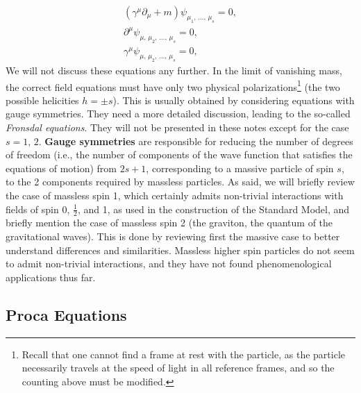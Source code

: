 \begin{equation}
    \begin{aligned}
        (\gamma^{\mu}\partial_\mu + m) \psi_{\mu_1,\,\dots,\,\mu_s} = 0, \\
        \partial^{\mu}\psi_{\mu,\,\mu_2,\,\dots,\,\mu_s} = 0,            \\
        \gamma^{\mu}\psi_{\mu,\,\mu_2,\,\dots,\,\mu_s} = 0,
    \end{aligned}
    \label{eq:fierz_pauli_equations_half_integer}
\end{equation}
We will not discuss these equations any further. In the limit of vanishing mass, the correct field equations must have only two physical polarizations\footnote{Recall that one cannot find a frame at rest with the particle, as the particle necessarily travels at the speed of light in all reference frames, and so the counting above must be modified.} (the two possible helicities \(h=\pm s\)). This is usually obtained by considering equations with gauge symmetries. They need a more detailed discussion, leading to the so-called \textit{Fronsdal equations}. They will not be presented in these notes except for the case \(s=1,\,2\). \textbf{Gauge symmetries} are responsible for reducing the number of degrees of freedom (i.e., the number of components of the wave function that satisfies the equations of motion) from \(2s+1\), corresponding to a massive particle of spin \(s\), to the 2 components required by massless particles. As said, we will briefly review the case of massless spin 1, which certainly admits non-trivial interactions with fields of spin 0, \(\tfrac12\), and 1, as used in the construction of the Standard Model, and briefly mention the case of massless spin 2 (the graviton, the quantum of the gravitational waves). This is done by reviewing first the massive case to better understand differences and similarities. Massless higher spin particles do not seem to admit non-trivial interactions, and they have not found phenomenological applications thus far.

\subsection{Proca Equations}

